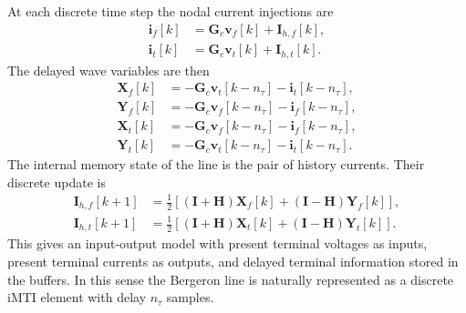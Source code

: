 At each discrete time step the nodal current injections are
\begin{align}
    \mathbf{i}_f[k] &= \mathbf{G}_c\mathbf{v}_f[k] + \mathbf{I}_{h,f}[k], \\
    \mathbf{i}_t[k] &= \mathbf{G}_c\mathbf{v}_t[k] + \mathbf{I}_{h,t}[k].
\end{align}
The delayed wave variables are then
\begin{align}
    \mathbf{X}_f[k] &= -\mathbf{G}_c\mathbf{v}_t[k-n_\tau]-\mathbf{i}_t[k-n_\tau], \\
    \mathbf{Y}_f[k] &= -\mathbf{G}_c\mathbf{v}_f[k-n_\tau]-\mathbf{i}_f[k-n_\tau], \\
    \mathbf{X}_t[k] &= -\mathbf{G}_c\mathbf{v}_f[k-n_\tau]-\mathbf{i}_f[k-n_\tau], \\
    \mathbf{Y}_t[k] &= -\mathbf{G}_c\mathbf{v}_t[k-n_\tau]-\mathbf{i}_t[k-n_\tau].
\end{align}
The internal memory state of the line is the pair of history currents. Their discrete update is
\begin{align}
    \mathbf{I}_{h,f}[k+1]
    &= \frac{1}{2}\left[(\mathbf{I}+\mathbf{H})\mathbf{X}_f[k]+(\mathbf{I}-\mathbf{H})\mathbf{Y}_f[k]\right], \\
    \mathbf{I}_{h,t}[k+1]
    &= \frac{1}{2}\left[(\mathbf{I}+\mathbf{H})\mathbf{X}_t[k]+(\mathbf{I}-\mathbf{H})\mathbf{Y}_t[k]\right].
\end{align}
This gives an input-output model with present terminal voltages as inputs, present terminal currents as outputs, and delayed terminal information stored in the buffers. In this sense the Bergeron line is naturally represented as a discrete iMTI element with delay $n_\tau$ samples.
